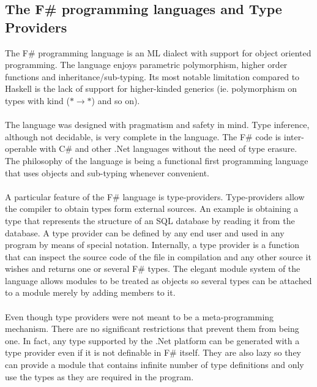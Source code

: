 \documentclass[8pt]{extarticle}
\begin{document}
\subsection{The F\# programming languages and Type Providers}
The F\#\cite{FSharp} programming language is an ML dialect with support for object oriented programming. The language enjoys parametric polymorphism, higher order functions and inheritance/sub-typing. Its most notable limitation compared to Haskell is the lack of support for higher-kinded generics (ie. polymorphism on types with kind ($*\to *$) and so on).
\\\\
The language was designed with pragmatism and safety in mind. Type inference, although not decidable, is very complete in the language. The F\# code is inter-operable with C\# and other .Net languages without the need of type erasure. The philosophy of the language is being a functional first programming language that uses objects and sub-typing whenever convenient.
\\\\
A particular feature of the F\# language is type-providers\cite{TypeProviders}. Type-providers allow the compiler to obtain types form external sources. An example is obtaining a type that represents the structure of an SQL database by reading it from the database. A type provider can be defined by any end user and used in any program by means of special notation. Internally, a type provider is a function that can inspect the source code of the file in compilation and any other source it wishes and returns one or several F\# types. The elegant module system of the language allows modules to be treated as objects so several types can be attached to a module merely by adding members to it.
\\\\
Even though type providers were not meant to be a meta-programming mechanism. There are no significant restrictions that prevent them from being one. In fact, any type supported by the .Net platform can be generated with a type provider even if it is not definable in F\# itself. They are also lazy so they can provide a module that contains infinite number of type definitions and only use the types as they are required in the program.
\end{document}
